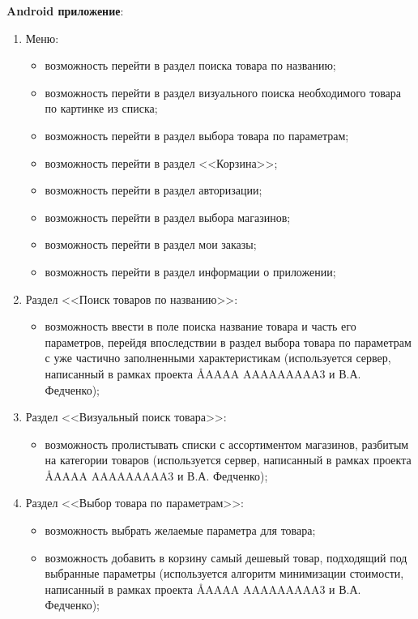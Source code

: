 \documentclass[a4paper,12pt]{article}
\begin{document}
  \noindent\textbf{Android приложение}:
  \begin{enumerate}
    \item Меню:
    \begin{itemize}
      \item возможность перейти в раздел поиска товара по названию;
      \item возможность перейти в раздел визуального поиска необходимого товара по картинке из списка;
      \item возможность перейти в раздел выбора товара по параметрам;
      \item возможность перейти в раздел <<Корзина>>;
      \item возможность перейти в раздел авторизации;
      \item возможность перейти в раздел выбора магазинов;
      \item возможность перейти в раздел мои заказы;
      \item возможность перейти в раздел информации о приложении;
    \end{itemize}
    \item Раздел <<Поиск товаров по названию>>:
    \begin{itemize}
      \item возможность ввести в поле поиска название товара и часть его параметров, перейдя впоследствии в раздел выбора товара по параметрам с уже частично заполненными характеристикам (используется сервер, написанный в рамках проекта \AA{AAAA AAAAAAAAA}{3} и В.А. Федченко);
    \end{itemize}
    \item Раздел <<Визуальный поиск товара>>:
    \begin{itemize}
      \item возможность пролистывать списки с ассортиментом магазинов, разбитым на категории товаров (используется сервер, написанный в рамках проекта \AA{AAAA AAAAAAAAA}{3} и В.А. Федченко);
    \end{itemize}
    \item Раздел <<Выбор товара по параметрам>>:
    \begin{itemize}
      \item возможность выбрать желаемые параметра для товара;
      \item возможность добавить в корзину самый дешевый товар, подходящий под выбранные параметры (используется алгоритм минимизации стоимости, написанный в рамках проекта \AA{AAAA AAAAAAAAA}{3} и В.А. Федченко);
    \end{itemize}

\end{enumerate}
\end{document}
